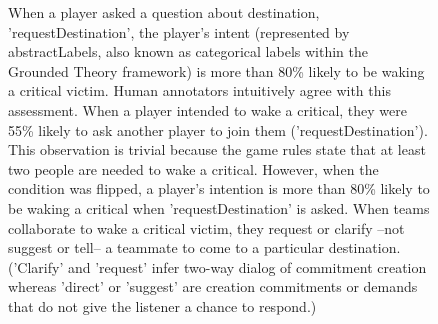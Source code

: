 \begin{figure}[h!]
    \centering
    \caption{When a player asked a question about destination, 'requestDestination', the player's intent (represented by abstractLabels, also known as categorical labels within the Grounded Theory framework) is more than 80\% likely to be waking a critical victim. Human annotators intuitively agree with this assessment. When a player intended to wake a critical, they were 55\% likely to ask another player to join them ('requestDestination'). This observation is trivial because the game rules state that at least two people are needed to wake a critical. However, when the condition was flipped, a player's intention is more than 80\% likely to be waking a critical when 'requestDestination' is asked. When teams collaborate to wake a critical victim, they request or clarify --not suggest or tell-- a teammate to come to a particular destination. ('Clarify' and 'request' infer two-way dialog of commitment creation whereas 'direct' or 'suggest' are creation commitments or demands that do not give the listener a chance to respond.) }
\end{figure}

